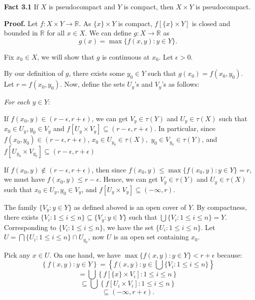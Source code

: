 \documentclass{article}
\begin{document}
\textbf{Fact 3.1} If $X$ is pseudocompact and $Y$ is compact, then $X\times Y$ is pseudocompact. 

\vskip 15pt


\textbf{Proof.} Let $f: X\times Y \rightarrow \mathbb{R}$. As $\{x\}\times Y$ is compact, $f\left[ \{x\} \times Y\right] $ is 
closed and bounded in $\mathbb{R}$ for all $x \in X$. We can define $g:X \rightarrow \mathbb{R}$ as 
$$g(x)=\max \{f(x,y):y\in Y\}.$$

Fix $x_0 \in X$, we will show that $g$ is continuous at $x_0$. Let $\epsilon >0$. 

\vskip 10pt


By our definition of $g$, there exists some $y_0\in Y$ such that $g(x_0)=f(x_0,y_0)$. Let $r=f(x_0,y_0)$. Now, define the sets $U_y$'s and $V_y$'s as follows:  \vskip 15pt

\emph{For each $y\in Y:$}
\vskip 5pt

If $f(x_0,y) \in (r-\epsilon, r+\epsilon)$, we can get $V_{y} \in \tau(Y) $ and $U_{y} \in \tau(X)$ such that $x_0\in U_y, y_0\in V_{y}$ and $f\left[U_y \times V_y\right] \subseteq (r-\epsilon, r+\epsilon)$. In particular, since $f(x_0,y_0) \in (r-\epsilon, r+\epsilon)$, $x_0\in U_{y_0}\in \tau(X),$ $y_0\in V_{y_0}\in \tau(Y)$, and $f\left[U_{y_0} \times V_{y_0}\right] \subseteq (r-\epsilon, r+\epsilon)$
\vskip 5pt

If $f(x_0,y) \notin (r-\epsilon, r+\epsilon)$, then since $f(x_0,y)\leq \max\{f(x_0,y):y\in Y\}=r$, we must have $f(x_0,y)\leq r-\epsilon$. Hence, we can get $V_{y} \in \tau(Y) $ and $U_{y} \in \tau(X)$ such that  $x_0\in U_y, y_0\in V_{y}$, and $f\left[U_y \times V_y\right] \subseteq (-\infty, r).$ \\

\vskip 12pt

The family $\{V_y: y\in Y\}$ as defined aboved is an open cover of $Y$. By compactness, there exists $\{V_i: 1\leq i \leq n\} \subseteq \{V_y: y\in Y\}$ such that $\bigcup \{V_i: 1\leq i \leq n\} = Y$. Corresponding to $\{V_i: 1\leq i \leq n\}$, we have the set $\{U_i: 1\leq i \leq n\}$. Let $U=\bigcap \{U_i: 1\leq i \leq n\} \cap U_{y_0}$, now $U$ is an open set containing $x_0$. \\

\vskip 5pt

Pick any $x\in U$. 
\vskip 10pt
On one hand, we have $\max\{f(x,y):y\in Y\}<r+\epsilon$ because:
$$\left\{f(x,y):y\in Y\right\} = \left\{f(x,y):y\in \bigcup \{V_i: 1\leq i \leq n\}\right\}$$
$$=\bigcup \left\{f\left[\{x\}\times V_i\right]: 1\leq i\leq n\right\}$$
$$\subseteq \bigcup \left\{f\left[U_i\times V_i\right]: 1\leq i\leq n\right\}$$
$$ \subseteq (-\infty, r+\epsilon).$$
\end{document}

